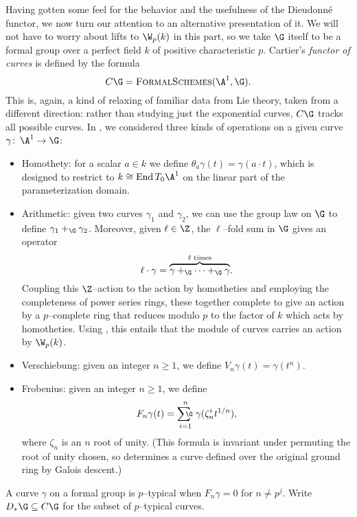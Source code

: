 Having gotten some feel for the behavior and the usefulness of the Dieudonn\'e functor, we now turn our attention to an alternative presentation of it.  We will not have to worry about lifts to \(\W_p(k)\) in this part, so we take \(\G\) itself to be a formal group over a perfect field \(k\) of positive characteristic \(p\).  Cartier's \textit{functor of curves} is defined by the formula \[C\G = \CatOf{FormalSchemes}(\A^1, \G).\]  This is, again, a kind of relaxing of familiar data from Lie theory, taken from a different direction: rather than studying just the exponential curves, \(C\G\) tracks all possible curves.  In , we considered three kinds of operations on a given curve \(\gamma\co \A^1 \to \G\):
\begin{itemize}
\item {}Homothety: for a scalar \(a \in k\) we define \(\theta_a \gamma(t) = \gamma(a \cdot t)\), which is designed to restrict to \(k \cong \End T_0 \A^1\) on the linear part of the parameterization domain.
\item {}Arithmetic: given two curves \(\gamma_1\) and \(\gamma_2\), we can use the group law on \(\G\) to define \(\gamma_1 +_{\G} \gamma_2\).  Moreover, given \(\ell \in \Z\), the \(\ell\)--fold sum in \(\G\) gives an operator \[\ell \cdot \gamma = \overset{\text{\(\ell\) times}}{\overbrace{\gamma +_{\G} \cdots +_{\G} \gamma}}.\]  Coupling this \(\Z\)--action to the action by homotheties and employing the completeness of power series rings, these together complete to give an action by a \(p\)--complete ring that reduces modulo \(p\) to the factor of \(k\) which acts by homotheties.  Using , this entails that the module of curves carries an action by \(\W_p(k)\).
\item {}Verschiebung: given an integer \(n \ge 1\), we define \(V_n \gamma(t) = \gamma(t^n)\).
\item {}Frobenius: given an integer \(n \ge 1\), we define \[F_n \gamma(t) = \sumG_{i=1}^n \gamma(\zeta_n^i t^{1/n}),\] where \(\zeta_{n}\) is an \(n\){\th} root of unity.  (This formula is invariant under permuting the root of unity chosen, so determines a curve defined over the original ground ring by Galois descent.)
\end{itemize}

\begin{definition}
A curve \(\gamma\) on a formal group is \(p\)--typical when \(F_n \gamma = 0\) for \(n \ne p^j\).  Write \(D_*\G \subseteq C\G\) for the subset of \(p\)--typical curves.
\end{definition}

